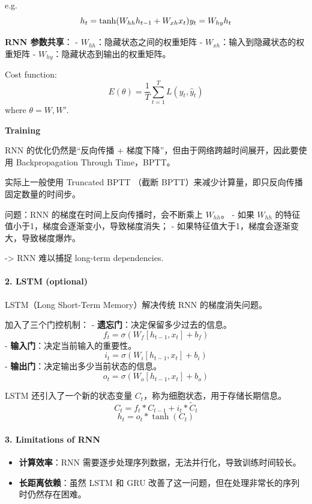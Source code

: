 \documentclass[
]{ctexart}
\providecommand{\tightlist}{%
  \setlength{\itemsep}{0pt}\setlength{\parskip}{0pt}}
\begin{document}
e.g.~ \[h_t = \tanh(W_{hh} h_{t-1} + W_{xh} x_t)\\
y_t = W_{hy} h_t\]

\textbf{RNN 参数共享}： - \(W_{hh}\)：隐藏状态之间的权重矩阵 -
\(W_{xh}\)：输入到隐藏状态的权重矩阵 -
\(W_{hy}\)：隐藏状态到输出的权重矩阵。

Cost function:
\[E(\theta) = \frac{1}{T} \sum_{t=1}^{T} L(y_t, \hat{y}_t)\] where
\(\theta = {W,W'}\).

\textbf{Training}

RNN 的优化仍然是``反向传播 +
梯度下降''，但由于网络跨越时间展开，因此要使用 Backpropagation Through
Time，BPTT。

实际上一般使用 Truncated BPTT （截断
BPTT）来减少计算量，即只反向传播固定数量的时间步。

问题：RNN 的梯度在时间上反向传播时，会不断乘上 \(W_{hh}\)。 - 如果
\(W_{hh}\) 的特征值小于1，梯度会逐渐变小，导致梯度消失； -
如果特征值大于1，梯度会逐渐变大，导致梯度爆炸。

-\textgreater{} RNN 难以捕捉 long-term dependencies.

\paragraph{2. LSTM (optional)}\label{lstm-optional}

LSTM（Long Short-Term Memory）解决传统 RNN 的梯度消失问题。

加入了三个门控机制： - \textbf{遗忘门}：决定保留多少过去的信息。
\[f_t = \sigma(W_f [h_{t-1}, x_t] + b_f)\] -
\textbf{输入门}：决定当前输入的重要性。
\[i_t = \sigma(W_i [h_{t-1}, x_t] + b_i)\] -
\textbf{输出门}：决定输出多少当前状态的信息。
\[o_t = \sigma(W_o [h_{t-1}, x_t] + b_o)\]

LSTM 还引入了一个新的状态变量 \(C_t\)，称为细胞状态，用于存储长期信息。
\[C_t = f_t * C_{t-1} + i_t * \tilde{C}_t\] \[h_t = o_t * \tanh(C_t)\]

\paragraph{3. Limitations of RNN}\label{limitations-of-rnn}

\begin{itemize}
\tightlist
\item
  \textbf{计算效率}：RNN
  需要逐步处理序列数据，无法并行化，导致训练时间较长。
\item
  \textbf{长距离依赖}：虽然 LSTM 和 GRU
  改善了这一问题，但在处理非常长的序列时仍然存在困难。
\end{itemize}
\end{document}
